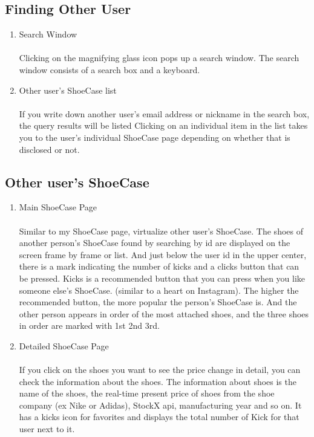 \documentclass[conference]{IEEEtran}
\begin{document}
\subsection{Finding Other User}
\begin{enumerate}
	\item Search Window\\
\\Clicking on the magnifying glass icon pops up a search window. The search window consists of a search box and a keyboard.\\
	\item Other user's ShoeCase list\\
\\If you write down another user's email address or nickname in the search box, the query results will be listed
Clicking on an individual item in the list takes you to the user's individual ShoeCase page depending on whether that is disclosed or not.\\
\end{enumerate}

\subsection{Other user's ShoeCase}
\begin{enumerate}
	\item Main ShoeCase Page\\
\\Similar to my ShoeCase page, virtualize other user's ShoeCase.
The shoes of another person's ShoeCase found by searching by id are displayed on the screen frame by frame or list. And just below the user id in the upper center, there is a mark indicating the number of kicks and a clicks button that can be pressed. Kicks is a recommended button that you can press when you like someone else's ShoeCase. (similar to a heart on Instagram). The higher the recommended button, the more popular the person's ShoeCase is. And the other person appears in order of the most attached shoes, and the three shoes in order are marked with 1st 2nd 3rd.\\
	\item Detailed ShoeCase Page\\
\\If you click on the shoes you want to see the price change in detail, you can check the information about the shoes. The information about shoes is the name of the shoes, the real-time present price of shoes from the shoe company (ex Nike or Adidas), StockX api, manufacturing year and so on.
It has a kicks icon for favorites and displays the total number of Kick for that user next to it.\\
\end{enumerate}
\end{document}
